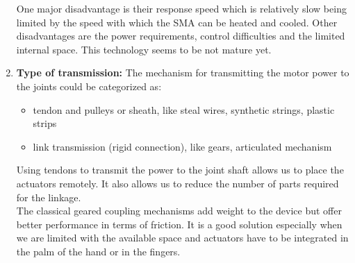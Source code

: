 \documentclass[a4paper, 10pt, conference]{ieeeconf}      %
\begin{document}
\begin{enumerate}
One major disadvantage is their response speed which is relatively slow being limited by the speed with which the SMA can be heated and cooled. Other disadvantages are the power requirements, control difficulties and the limited internal space. This technology seems to be not mature yet.\\
  \item \textbf{Type of transmission:}
The mechanism for transmitting the motor power to the joints could be categorized as:\\
\begin{itemize}
		\item tendon and pulleys or sheath, like steal wires, synthetic strings, plastic strips
		\item link transmission (rigid connection), like gears, articulated mechanism\\
	\end{itemize}
Using tendons to transmit the power to the joint shaft allows us to place the actuators remotely. It also allows us to reduce the number of parts required for the linkage.\\
The classical geared coupling mechanisms add weight to the device but offer better performance in terms of friction. It is a good solution especially when we are limited with the available space and actuators have to be integrated in the palm of the hand or in the fingers.\\
\end{enumerate}
\end{document}
